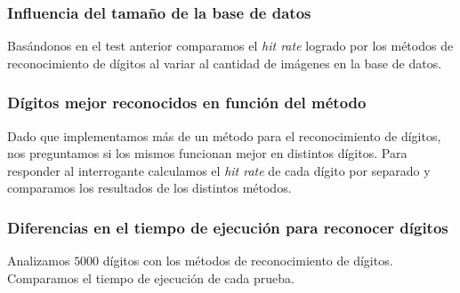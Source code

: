 	\subsubsection{Influencia del tama\~no de la base de datos}
		Bas\'andonos en el test anterior comparamos el \textit{hit rate} logrado
		por los m\'etodos de reconocimiento de d\'igitos al variar al cantidad
		de im\'agenes en la base de datos.
		
	\subsubsection{D\'igitos mejor reconocidos en funci\'on del m\'etodo}
		Dado que implementamos m\'as de un m\'etodo para el reconocimiento de
		d\'igitos, nos preguntamos si los mismos funcionan mejor en distintos
		d\'igitos. Para responder al interrogante calculamos el \textit{hit rate}
		de cada d\'igito por separado y comparamos los resultados de los
		distintos m\'etodos.

	\subsubsection{Diferencias en el tiempo de ejecuci\'on para reconocer d\'igitos}
		Analizamos $5000$ d\'igitos con los m\'etodos de reconocimiento de
		d\'igitos. Comparamos el tiempo de ejecuci\'on de cada prueba.
